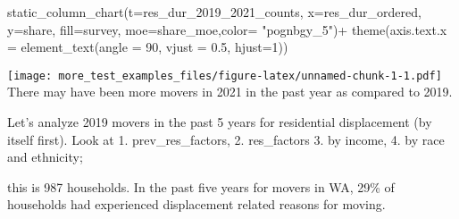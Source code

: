 \documentclass[
]{article}
\newenvironment{Shaded}{\begin{snugshade}}{\end{snugshade}}
\newcommand{\AttributeTok}[1]{\textcolor[rgb]{0.77,0.63,0.00}{#1}}
\newcommand{\DecValTok}[1]{\textcolor[rgb]{0.00,0.00,0.81}{#1}}
\newcommand{\FloatTok}[1]{\textcolor[rgb]{0.00,0.00,0.81}{#1}}
\newcommand{\FunctionTok}[1]{\textcolor[rgb]{0.00,0.00,0.00}{#1}}
\newcommand{\NormalTok}[1]{#1}
\newcommand{\SpecialCharTok}[1]{\textcolor[rgb]{0.00,0.00,0.00}{#1}}
\newcommand{\StringTok}[1]{\textcolor[rgb]{0.31,0.60,0.02}{#1}}
\begin{document}
\begin{Shaded}
\begin{Highlighting}[]
\FunctionTok{static\_column\_chart}\NormalTok{(}\AttributeTok{t=}\NormalTok{res\_dur\_2019\_2021\_counts, }\AttributeTok{x=}\StringTok{\textquotesingle{}res\_dur\_ordered\textquotesingle{}}\NormalTok{, }\AttributeTok{y=}\StringTok{\textquotesingle{}share\textquotesingle{}}\NormalTok{, }\AttributeTok{fill=}\StringTok{\textquotesingle{}survey\textquotesingle{}}\NormalTok{, }\AttributeTok{moe=}\StringTok{\textquotesingle{}share\_moe\textquotesingle{}}\NormalTok{,}\AttributeTok{color=}  \StringTok{"pognbgy\_5"}\NormalTok{)}\SpecialCharTok{+} \FunctionTok{theme}\NormalTok{(}\AttributeTok{axis.text.x =} \FunctionTok{element\_text}\NormalTok{(}\AttributeTok{angle =} \DecValTok{90}\NormalTok{, }\AttributeTok{vjust =} \FloatTok{0.5}\NormalTok{, }\AttributeTok{hjust=}\DecValTok{1}\NormalTok{))}
\end{Highlighting}
\end{Shaded}

\texttt{[image: more\_test\_examples\_files/figure-latex/unnamed-chunk-1-1.pdf]}
There may have been more movers in 2021 in the past year as compared to
2019.

Let's analyze 2019 movers in the past 5 years for residential
displacement (by itself first). Look at 1. prev\_res\_factors, 2.
res\_factors 3. by income, 4. by race and ethnicity;

this is 987 households. In the past five years for movers in WA, 29\% of
households had experienced displacement related reasons for moving.
\end{document}
